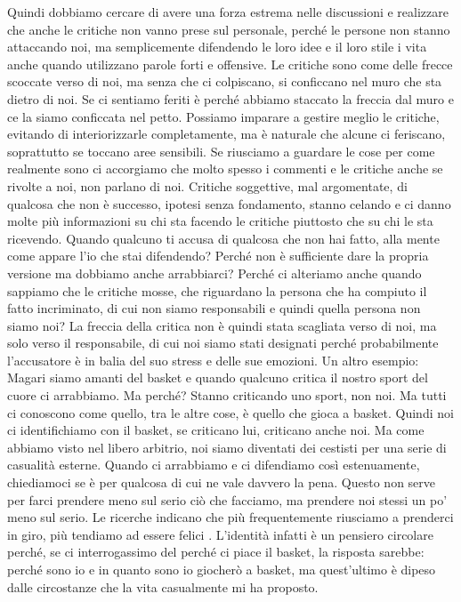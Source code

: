 \documentclass[12pt]{book} %
\begin{document}
Quindi dobbiamo cercare di avere una forza estrema nelle discussioni e realizzare che anche le critiche non vanno prese
sul personale, perché le persone non stanno attaccando noi, ma semplicemente difendendo le loro idee e il loro stile i
vita anche quando utilizzano parole forti e offensive. Le critiche sono come delle frecce scoccate verso di noi, ma
senza che ci colpiscano, si conficcano nel muro che sta dietro di noi. Se ci sentiamo feriti è perché abbiamo staccato
la freccia dal muro e ce la siamo conficcata nel petto. Possiamo imparare a gestire meglio le critiche, evitando di interiorizzarle completamente, ma è naturale che alcune ci feriscano, soprattutto se toccano aree sensibili. Se riusciamo a guardare le cose per come realmente sono ci
accorgiamo che molto spesso i commenti e le critiche anche se rivolte a noi, non parlano di noi. Critiche soggettive,
mal argomentate, di qualcosa che non è successo, ipotesi senza fondamento, stanno celando e ci danno molte più
informazioni su chi sta facendo le critiche piuttosto che su chi le sta ricevendo. Quando qualcuno ti accusa di
qualcosa che non hai fatto, alla mente come appare l'io che stai difendendo? Perché non è
sufficiente dare la propria versione ma dobbiamo anche arrabbiarci? Perché ci alteriamo anche quando sappiamo che le
critiche mosse, che riguardano la persona che ha compiuto il fatto incriminato, di cui non siamo responsabili e quindi
quella persona non siamo noi? La freccia della critica non è quindi stata scagliata verso di noi, ma solo verso il
responsabile, di cui noi siamo stati designati perché probabilmente l'accusatore è in balia del
suo stress e delle sue emozioni. Un altro esempio: Magari siamo amanti del basket e quando qualcuno critica il nostro
sport del cuore ci arrabbiamo. Ma perché? Stanno criticando uno sport, non noi. Ma tutti ci conoscono come quello, tra
le altre cose, è quello che gioca a basket. Quindi noi ci identifichiamo con il basket, se criticano lui, criticano
anche noi. Ma come abbiamo visto nel libero arbitrio, noi siamo diventati dei cestisti per una serie di casualità
esterne. Quando ci arrabbiamo e ci difendiamo così estenuamente, chiediamoci se è per qualcosa di cui ne vale davvero la pena. Questo non serve per farci prendere meno sul serio ciò che facciamo, ma prendere noi
stessi un po' meno sul serio. 
Le ricerche indicano che più frequentemente riusciamo a prenderci in giro, più tendiamo ad essere felici .
L'identità infatti è un pensiero circolare
perché, se ci interrogassimo del perché ci piace il basket, la risposta sarebbe: perché sono io e in quanto sono io
giocherò a basket, ma quest'ultimo è dipeso dalle circostanze che la vita casualmente mi ha
proposto.
\end{document}
